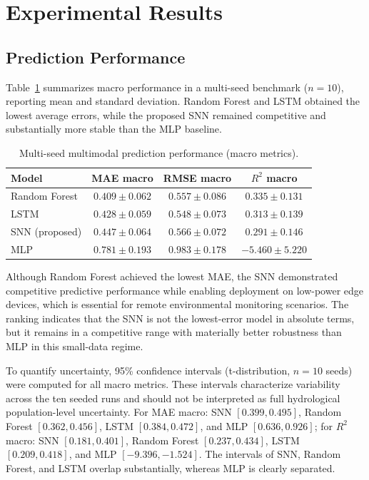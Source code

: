 \section{Experimental Results}

\subsection{Prediction Performance}
Table~\ref{tab:pred_perf} summarizes macro performance in a multi-seed benchmark ($n=10$), reporting mean and standard deviation. Random Forest and LSTM obtained the lowest average errors, while the proposed SNN remained competitive and substantially more stable than the MLP baseline.

\begin{table}[!ht]
\caption{Multi-seed multimodal prediction performance (macro metrics).}
\label{tab:pred_perf}
\centering
\footnotesize
\setlength{\tabcolsep}{3pt}
\begin{tabular}{lccc}
\toprule
Model & MAE macro & RMSE macro & $R^2$ macro \\
\midrule
Random Forest & $\mathbf{0.409 \pm 0.062}$ & $0.557 \pm 0.086$ & $\mathbf{0.335 \pm 0.131}$ \\
LSTM & $0.428 \pm 0.059$ & $\mathbf{0.548 \pm 0.073}$ & $0.313 \pm 0.139$ \\
SNN (proposed) & $0.447 \pm 0.064$ & $0.566 \pm 0.072$ & $0.291 \pm 0.146$ \\
MLP & $0.781 \pm 0.193$ & $0.983 \pm 0.178$ & $-5.460 \pm 5.220$ \\
\bottomrule
\end{tabular}
\end{table}

Although Random Forest achieved the lowest MAE, the SNN demonstrated competitive predictive performance while enabling deployment on low-power edge devices, which is essential for remote environmental monitoring scenarios. The ranking indicates that the SNN is not the lowest-error model in absolute terms, but it remains in a competitive range with materially better robustness than MLP in this small-data regime.

{\sloppy To quantify uncertainty, 95\% confidence intervals (t-distribution, $n=10$ seeds) were computed for all macro metrics. These intervals characterize variability across the ten seeded runs and should not be interpreted as full hydrological population-level uncertainty. For MAE macro: SNN $[0.399, 0.495]$, Random Forest $[0.362, 0.456]$, LSTM $[0.384, 0.472]$, and MLP $[0.636, 0.926]$; for $R^2$ macro: SNN $[0.181, 0.401]$, Random Forest $[0.237, 0.434]$, LSTM $[0.209, 0.418]$, and MLP $[-9.396, -1.524]$. The intervals of SNN, Random Forest, and LSTM overlap substantially, whereas MLP is clearly separated.\par}

